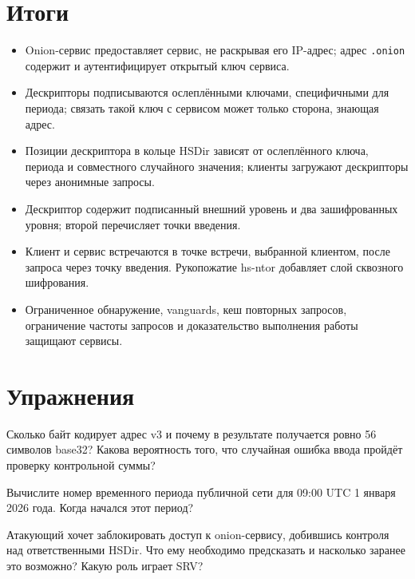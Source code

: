 \section*{Итоги}
\begin{itemize}
  \item Onion-сервис предоставляет сервис, не раскрывая его IP-адрес; адрес \texttt{.onion} содержит и аутентифицирует открытый ключ сервиса.
  \item Дескрипторы подписываются ослеплёнными ключами, специфичными для периода; связать такой ключ с сервисом может только сторона, знающая адрес.
  \item Позиции дескриптора в кольце HSDir зависят от ослеплённого ключа, периода и совместного случайного значения; клиенты загружают дескрипторы через анонимные запросы.
  \item Дескриптор содержит подписанный внешний уровень и два зашифрованных уровня; второй перечисляет точки введения.
  \item Клиент и сервис встречаются в точке встречи, выбранной клиентом, после запроса через точку введения. Рукопожатие hs-ntor добавляет слой сквозного шифрования.
  \item Ограниченное обнаружение, vanguards, кеш повторных запросов, ограничение частоты запросов и доказательство выполнения работы защищают сервисы.
\end{itemize}

\section*{Упражнения}

\begin{esercizio}[1]\label{es:14-indirizzo}
Сколько байт кодирует адрес v3 и почему в результате получается ровно 56 символов base32? Какова вероятность того, что случайная ошибка ввода пройдёт проверку контрольной суммы?
\end{esercizio}

\begin{esercizio}[1]\label{es:14-periodo}
Вычислите номер временного периода публичной сети для 09:00 UTC 1 января 2026 года. Когда начался этот период?
\end{esercizio}

\begin{esercizio}[2]\label{es:14-hsdir}
Атакующий хочет заблокировать доступ к onion-сервису, добившись контроля над ответственными HSDir. Что ему необходимо предсказать и насколько заранее это возможно? Какую роль играет SRV?
\end{esercizio}

